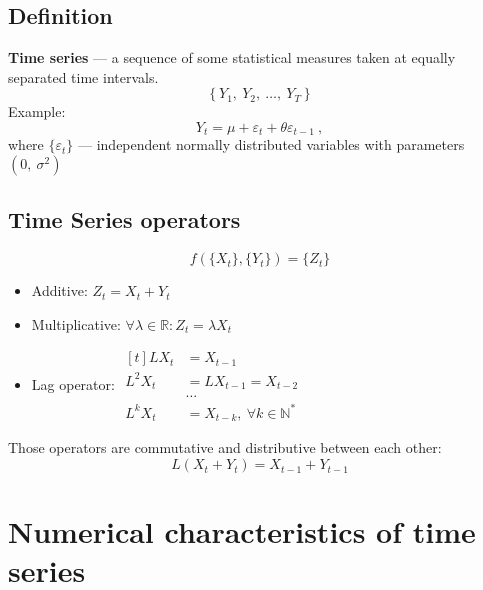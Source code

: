 \documentclass[12pt, english]{article}
\numberwithin{equation}{section} %
\theoremstyle{plain}
\theoremstyle{definition}
\begin{document}
\subsection{Definition}
\textbf{Time series} --- a sequence of some statistical measures taken at equally separated time intervals.
$$
\left\{ Y_1,\ Y_2,\ \dots,\ Y_T \right\}
$$
Example:  
$$Y_t = \mu + \varepsilon_t + \theta \varepsilon_{t-1} \ ,$$
where $\{ \varepsilon_t \}$ --- independent normally distributed variables with parameters $(0,\  \sigma^2)$

\subsection{Time Series operators}
$$f \left( \{ X_t \}, \{ Y_t \} \right) = \{ Z_t \}$$

\begin{itemize}
	\item Additive: $Z_t = X_t + Y_t$
	\item Multiplicative: $\forall \lambda \in \mathbb{R} : Z_t = \lambda X_t$
	\item Lag operator: $
		\begin{aligned}[t]
			L X_t &= X_{t-1} \\
			L^2 X_t &= L X_{t-1} = X_{t-2} \\
			& \dots \\
			L^k X_t &= X_{t-k},\ \forall k \in \mathbb{N}^*
		\end{aligned}
		$
\end{itemize}
Those operators are commutative and distributive between each other:
$$L(X_t + Y_t) = X_{t-1} + Y_{t-1}$$


\section{Numerical characteristics of time series }
\end{document}
